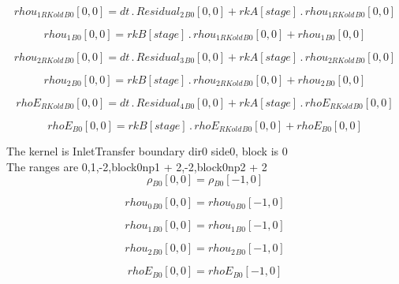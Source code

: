 \documentclass{article}
\begin{document}
\begin{dmath}{rhou_{1 RKold}{_{B0}}}[{0,0}] = dt \,.\, {Residual_{2}{_{B0}}}[{0,0}] + {rkA}[{stage}] \,.\, {rhou_{1 RKold}{_{B0}}}[{0,0}]\end{dmath}

\begin{dmath}{rhou_{1}{_{B0}}}[{0,0}] = {rkB}[{stage}] \,.\, {rhou_{1 RKold}{_{B0}}}[{0,0}] + {rhou_{1}{_{B0}}}[{0,0}]\end{dmath}

\begin{dmath}{rhou_{2 RKold}{_{B0}}}[{0,0}] = dt \,.\, {Residual_{3}{_{B0}}}[{0,0}] + {rkA}[{stage}] \,.\, {rhou_{2 RKold}{_{B0}}}[{0,0}]\end{dmath}

\begin{dmath}{rhou_{2}{_{B0}}}[{0,0}] = {rkB}[{stage}] \,.\, {rhou_{2 RKold}{_{B0}}}[{0,0}] + {rhou_{2}{_{B0}}}[{0,0}]\end{dmath}

\begin{dmath}{rhoE_{RKold}{_{B0}}}[{0,0}] = dt \,.\, {Residual_{4}{_{B0}}}[{0,0}] + {rkA}[{stage}] \,.\, {rhoE_{RKold}{_{B0}}}[{0,0}]\end{dmath}

\begin{dmath}{rhoE{_{B0}}}[{0,0}] = {rkB}[{stage}] \,.\, {rhoE_{RKold}{_{B0}}}[{0,0}] + {rhoE{_{B0}}}[{0,0}]\end{dmath}

\noindent The kernel is InletTransfer boundary dir0 side0, block is 0\\\noindent The ranges are 0,1,-2,block0np1 + 2,-2,block0np2 + 2\\\begin{dmath}{\rho{_{B0}}}[{0,0}] = {\rho{_{B0}}}[{-1,0}]\end{dmath}

\begin{dmath}{rhou_{0}{_{B0}}}[{0,0}] = {rhou_{0}{_{B0}}}[{-1,0}]\end{dmath}

\begin{dmath}{rhou_{1}{_{B0}}}[{0,0}] = {rhou_{1}{_{B0}}}[{-1,0}]\end{dmath}

\begin{dmath}{rhou_{2}{_{B0}}}[{0,0}] = {rhou_{2}{_{B0}}}[{-1,0}]\end{dmath}

\begin{dmath}{rhoE{_{B0}}}[{0,0}] = {rhoE{_{B0}}}[{-1,0}]\end{dmath}
\end{document}
